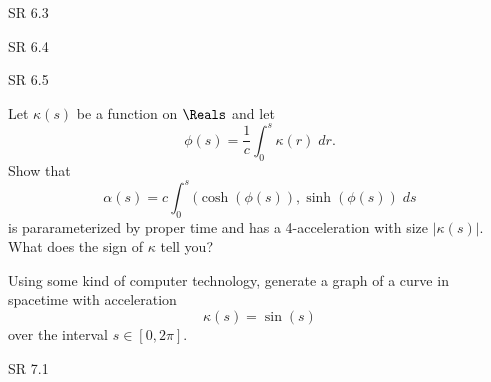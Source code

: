 \documentclass[minion]{homework}
\begin{document}
\begin{aproblems}

\hproblem SR 6.3

\hproblem SR 6.4

\hproblem SR 6.5

\hproblem 
Let $\kappa(s)$ be a function on $\Reals$ and let
\begin{equation}
\phi(s) = \frac{1}{c} \int_0^s \kappa(r)\; dr.
\end{equation}
Show that
\begin{equation}
\alpha(s) = c \int_0^s (\cosh(\phi(s)),\sinh(\phi(s))\; ds
\end{equation}
is pararameterized by proper time and has a 4-acceleration with
size $|\kappa(s)|$.  What does the sign of $\kappa$ tell you?

\hproblem Using some kind of computer technology, generate a graph of a curve in spacetime with acceleration 
\begin{equation}
\kappa(s) = \sin(s)
\end{equation}
over the interval $s\in [0,2\pi]$.

\hproblem SR 7.1


\end{aproblems}
\end{document}
